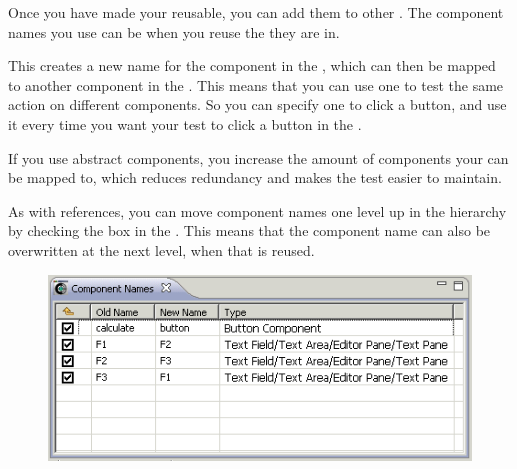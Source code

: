  \label{reassconcepts}
Once you have made your \gdcases{} reusable, you can add them to other \gdcases{}. 
The  component names you use can be  when you reuse the \gdcase{} they are in. 

This creates a new name for the component in the \gdomeditor{}, which can then be mapped to another component in the \gdaut{}. This means that you can use one \gdcase{} to test the same action on different components. So you can specify one \gdcase{} to click a button, and use it every time you want your test to click a button in the \gdaut{}.


If you use abstract components, you increase the amount of components your \gdcase{} can be mapped to, which reduces redundancy and makes the test easier to maintain. 

As with references, you can move component names one level up in the hierarchy by checking the box in the \gdcompnamesview{}. This means that the component name can also be overwritten at the next level, when that \gdcase{} is reused.  

\begin{figure}
\begin{center}
\includegraphics{Concepts/PS/compnames}
\caption{\gdcompnamesview}
\label{compnames}
\end{center}
\end{figure}



